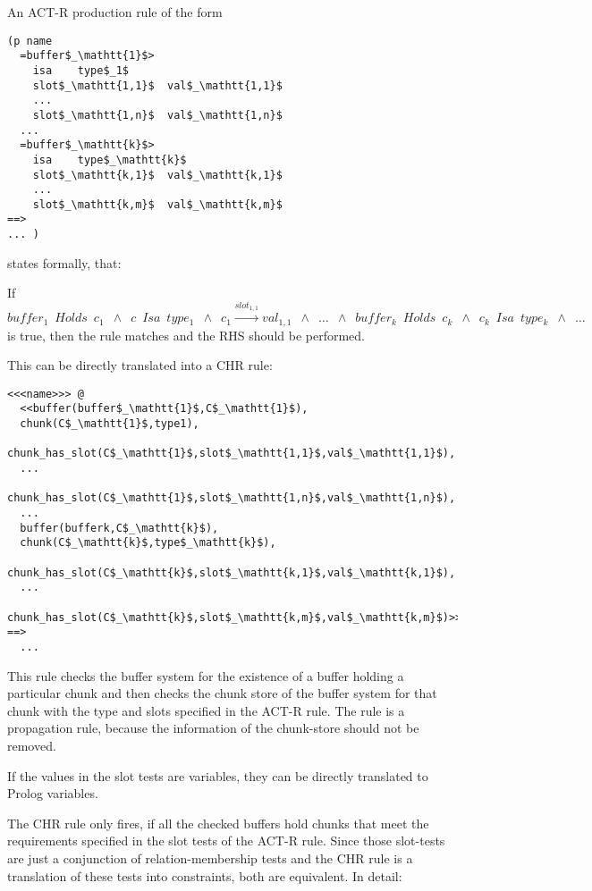 An ACT-R production rule of the form

\begin{lstlisting}[mathescape]
(p name
  =buffer$_\mathtt{1}$>
    isa    type$_1$
    slot$_\mathtt{1,1}$  val$_\mathtt{1,1}$
    ...
    slot$_\mathtt{1,n}$  val$_\mathtt{1,n}$
  ...
  =buffer$_\mathtt{k}$>
    isa    type$_\mathtt{k}$
    slot$_\mathtt{k,1}$  val$_\mathtt{k,1}$
    ...
    slot$_\mathtt{k,m}$  val$_\mathtt{k,m}$
==>
... )
\end{lstlisting}

states formally, that:

If $buffer_1 \enspace Holds \enspace c_1 \enspace \wedge \enspace c \enspace Isa \enspace type_1 \enspace \wedge \enspace c_1 \xrightarrow{slot_{1,1}} val_{1,1} \enspace \wedge \enspace \dots \enspace \wedge \enspace buffer_k \enspace Holds \enspace c_k \enspace \wedge \enspace c_k \enspace Isa \enspace type_k \enspace \wedge \enspace \dots$ is true, then the rule matches and the RHS should be performed.

This can be directly translated into a CHR rule:

\begin{lstlisting}[mathescape]
<<<name>>> @
  <<buffer(buffer$_\mathtt{1}$,C$_\mathtt{1}$),
  chunk(C$_\mathtt{1}$,type1),
  chunk_has_slot(C$_\mathtt{1}$,slot$_\mathtt{1,1}$,val$_\mathtt{1,1}$),
  ...
  chunk_has_slot(C$_\mathtt{1}$,slot$_\mathtt{1,n}$,val$_\mathtt{1,n}$),
  ...
  buffer(bufferk,C$_\mathtt{k}$),
  chunk(C$_\mathtt{k}$,type$_\mathtt{k}$),
  chunk_has_slot(C$_\mathtt{k}$,slot$_\mathtt{k,1}$,val$_\mathtt{k,1}$),
  ...
  chunk_has_slot(C$_\mathtt{k}$,slot$_\mathtt{k,m}$,val$_\mathtt{k,m}$)>>
==>
  ...
\end{lstlisting}

This rule checks the buffer system for the existence of a buffer holding a particular chunk and then checks the chunk store of the buffer system for that chunk with the type and slots specified in the ACT-R rule. The rule is a propagation rule, because the information of the chunk-store should not be removed.

If the values in the slot tests are variables, they can be directly translated to Prolog variables.

The CHR rule only fires, if all the checked buffers hold chunks that meet the requirements specified in the slot tests of the ACT-R rule. Since those slot-tests are just a conjunction of relation-membership tests and the CHR rule is a translation of these tests into constraints, both are equivalent. In detail: 

